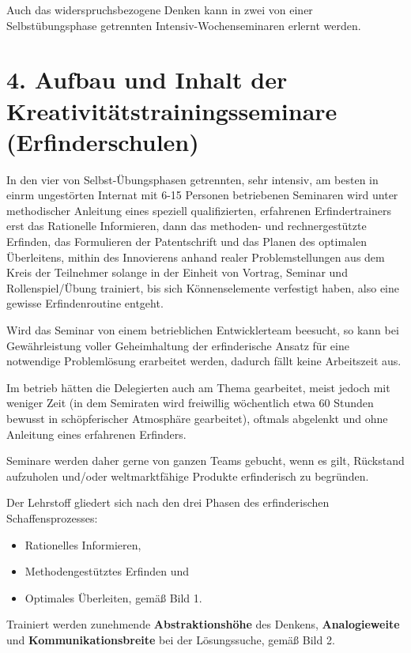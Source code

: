 \documentclass[11pt,a4paper]{article}
\begin{document}
Auch das widerspruchsbezogene Denken kann in zwei von einer Selbstübungsphase
getrennten Intensiv-Wochenseminaren erlernt werden.

\section*{4. Aufbau und Inhalt der Kreativitätstrainingsseminare
  (Erfinderschulen)} 

In den vier von Selbst-Übungsphasen getrennten, sehr intensiv, am besten in
einrm ungestörten Internat mit 6-15 Personen betriebenen Seminaren wird
unter methodischer Anleitung eines speziell qualifizierten, erfahrenen
Erfindertrainers erst das Rationelle Informieren, dann das methoden- und
rechnergestützte Erfinden, das Formulieren der Patentschrift und das
Planen des optimalen Überleitens, mithin des Innovierens anhand realer
Problemstellungen aus dem Kreis der Teilnehmer solange in der Einheit von
Vortrag, Seminar und Rollenspiel/Übung trainiert, bis sich Könnenselemente
verfestigt haben, also eine gewisse Erfindenroutine entgeht.

Wird das Seminar von einem betrieblichen Entwicklerteam beesucht, so kann bei
Gewähr\-leis\-tung voller Geheimhaltung der erfinderische Ansatz für eine
notwendige Problemlösung erarbeitet werden, dadurch fällt keine Arbeitszeit
aus.

Im betrieb hätten die Delegierten auch am Thema gearbeitet, meist jedoch mit
weniger Zeit (in dem Semiraten wird freiwillig wöchentlich etwa 60 Stunden
bewusst in schöpferischer Atmosphäre gearbeitet), oftmals abgelenkt und ohne
Anleitung eines erfahrenen Erfinders.

Seminare werden daher gerne von ganzen Teams gebucht, wenn es gilt, Rückstand 
aufzuholen und/oder weltmarktfähige Produkte erfinderisch zu begründen.

Der Lehrstoff gliedert sich nach den drei Phasen des erfinderischen
Schaffensprozesses:
\begin{itemize}[noitemsep]
\item Rationelles Informieren,
\item Methodengestütztes Erfinden und
\item Optimales Überleiten, gemäß Bild 1.
\end{itemize}
Trainiert werden zunehmende \textbf{Abstraktionshöhe} des Denkens,
\textbf{Analogieweite} und \textbf{Kommunikationsbreite} bei der Lösungssuche,
gemäß Bild 2.
\end{document}

